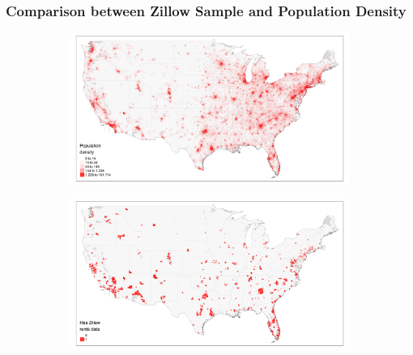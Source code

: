 \documentclass[aspectratio=169, t]{beamer}
\begin{document}
\begin{frame}[label = zillow_pop_density]
    \frametitle{Comparison between Zillow Sample and Population Density}
    \begin{figure}
        \centering
    \vspace{10mm}
    \hspace{-23mm}
        \begin{subfigure}{0.40\textwidth}
            \includegraphics[scale = 0.32]{maps_US/output/USPS_zipcodes_pop_density.png}
        \end{subfigure}%
    \quad\quad\quad\quad\quad\quad
        \begin{subfigure}{0.40\textwidth}
            \includegraphics[scale = 0.32]{maps_US/output/USPS_zipcodes_zillow_data.png}
        \end{subfigure}
    \end{figure}
    \hyperlink{zillow_data}{}
\end{frame}
\end{document}
